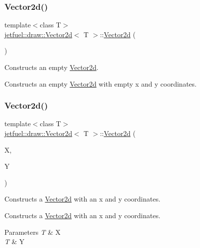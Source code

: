 \subsubsection{\texorpdfstring{Vector2d()}{Vector2d()}\hspace{0.1cm}{\footnotesize\ttfamily [1/2]}}
{\footnotesize\ttfamily template$<$class T$>$ \\
\hyperlink{classjetfuel_1_1draw_1_1Vector2d}{jetfuel\+::draw\+::\+Vector2d}$<$ T $>$\+::\hyperlink{classjetfuel_1_1draw_1_1Vector2d}{Vector2d} (\begin{DoxyParamCaption}{ }\end{DoxyParamCaption})\hspace{0.3cm}{\ttfamily [inline]}}



Constructs an empty \hyperlink{classjetfuel_1_1draw_1_1Vector2d}{Vector2d}. 

Constructs an empty \hyperlink{classjetfuel_1_1draw_1_1Vector2d}{Vector2d} with empty x and y coordinates. \mbox{\label{classjetfuel_1_1draw_1_1Vector2d_a4d083d396d055fab0385f2230177c386}} 
\subsubsection{\texorpdfstring{Vector2d()}{Vector2d()}\hspace{0.1cm}{\footnotesize\ttfamily [2/2]}}
{\footnotesize\ttfamily template$<$class T$>$ \\
\hyperlink{classjetfuel_1_1draw_1_1Vector2d}{jetfuel\+::draw\+::\+Vector2d}$<$ T $>$\+::\hyperlink{classjetfuel_1_1draw_1_1Vector2d}{Vector2d} (\begin{DoxyParamCaption}\item[{T}]{X,  }\item[{T}]{Y }\end{DoxyParamCaption})\hspace{0.3cm}{\ttfamily [inline]}}



Constructs a \hyperlink{classjetfuel_1_1draw_1_1Vector2d}{Vector2d} with an x and y coordinates. 

Constructs a \hyperlink{classjetfuel_1_1draw_1_1Vector2d}{Vector2d} with an x and y coordinates.


\begin{DoxyParams}{Parameters}
{\em T} & X \\
\hline
{\em T} & Y \\
\hline
\end{DoxyParams}


